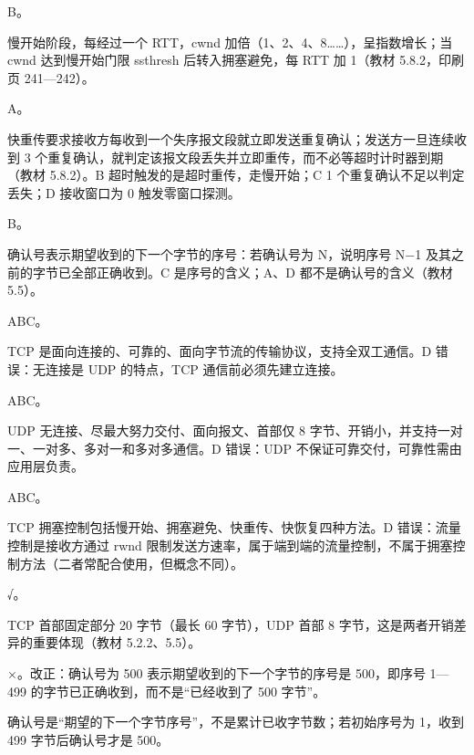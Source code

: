 \documentclass[a4paper,11pt]{article}
\begin{document}
\q B。\begin{analysis}慢开始阶段，每经过一个 RTT，cwnd 加倍（1、2、4、8……），呈指数增长；当 cwnd 达到慢开始门限 ssthresh 后转入拥塞避免，每 RTT 加 1（教材 5.8.2，印刷页 241—242）。\end{analysis}

\q A。\begin{analysis}快重传要求接收方每收到一个失序报文段就立即发送重复确认；发送方一旦连续收到 3 个重复确认，就判定该报文段丢失并立即重传，而不必等超时计时器到期（教材 5.8.2）。B 超时触发的是超时重传，走慢开始；C 1 个重复确认不足以判定丢失；D 接收窗口为 0 触发零窗口探测。\end{analysis}

\q B。\begin{analysis}确认号表示期望收到的下一个字节的序号：若确认号为 N，说明序号 N−1 及其之前的字节已全部正确收到。C 是序号的含义；A、D 都不是确认号的含义（教材 5.5）。\end{analysis}


\q ABC。\begin{analysis}TCP 是面向连接的、可靠的、面向字节流的传输协议，支持全双工通信。D 错误：无连接是 UDP 的特点，TCP 通信前必须先建立连接。\end{analysis}

\q ABC。\begin{analysis}UDP 无连接、尽最大努力交付、面向报文、首部仅 8 字节、开销小，并支持一对一、一对多、多对一和多对多通信。D 错误：UDP 不保证可靠交付，可靠性需由应用层负责。\end{analysis}

\q ABC。\begin{analysis}TCP 拥塞控制包括慢开始、拥塞避免、快重传、快恢复四种方法。D 错误：流量控制是接收方通过 rwnd 限制发送方速率，属于端到端的流量控制，不属于拥塞控制方法（二者常配合使用，但概念不同）。\end{analysis}


\q √。\begin{analysis}TCP 首部固定部分 20 字节（最长 60 字节），UDP 首部 8 字节，这是两者开销差异的重要体现（教材 5.2.2、5.5）。\end{analysis}

\q ×。改正：确认号为 500 表示期望收到的下一个字节的序号是 500，即序号 1—499 的字节已正确收到，而不是“已经收到了 500 字节”。\begin{analysis}确认号是“期望的下一个字节序号”，不是累计已收字节数；若初始序号为 1，收到 499 字节后确认号才是 500。\end{analysis}
\end{document}
